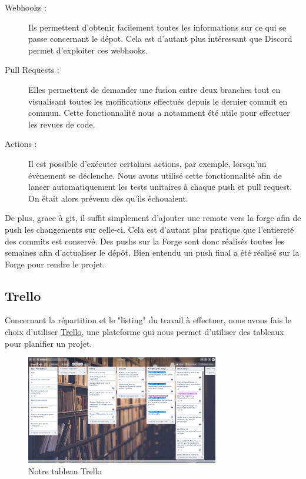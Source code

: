 			\begin{description}
				\item[Webhooks :]{Ils permettent d'obtenir facilement toutes les informations sur ce qui se passe concernant le dépot. Cela est d'autant plus intéressant que Discord permet d'exploiter ces webhooks.}
				\item[Pull Requests :]{Elles permettent de demander une fusion entre deux branches tout en visualisant toutes les mofifications effectués depuis le dernier commit en commun. Cette fonctionnalité nous a notamment été utile pour effectuer les revues de code.}
				\item[Actions :]{Il est possible d'exécuter certaines actions, par exemple, lorsqu'un évènement se déclenche. Nous avons utilisé cette fonctionnalité afin de lancer automatiquement les tests unitaires à chaque push et pull request. On était alors prévenu dès qu'ils échouaient.}
			\end{description}

			De plus, grace à git, il suffit simplement d'ajouter une remote vers la forge afin de push les changements sur celle-ci. Cela est d'autant plus pratique que l'entiereté des commits est conservé. Des pushs sur la Forge sont donc réalisés toutes les semaines afin d'actualiser le dépôt. Bien entendu un push final a été réalisé sur la Forge pour rendre le projet.

		\subsection{Trello}

			Concernant la répartition et le "listing" du travail à effectuer, nous avons fais le choix d'utiliser \href{https://trello.com}{Trello}, une plateforme qui nous permet d'utiliser des tableaux pour planifier un projet.

			\begin{figure}[H]
				\centering\includegraphics[width=0.75\textwidth, keepaspectratio]{img/trello.png}
				\caption{Notre tableau Trello}
				\label{fig:trello}
			\end{figure}

